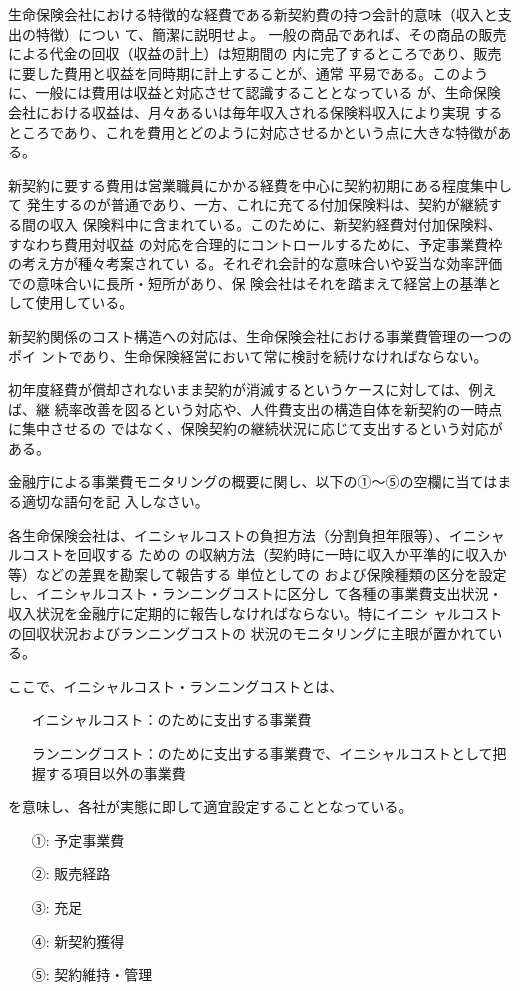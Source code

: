\documentclass[report,gutter=10mm,fore-edge=10mm,uplatex,dvipdfmx]{jlreq}
\begin{document}
生命保険会社における特徴的な経費である新契約費の持つ会計的意味（収入と支出の特徴）につい
て、簡潔に説明せよ。
\answer{}
一般の商品であれば、その商品の販売による代金の回収（収益の計上）は短期間の
内に完了するところであり、販売に要した費用と収益を同時期に計上することが、通常
平易である。このように、一般には費用は収益と対応させて認識することとなっている
が、生命保険会社における収益は、月々あるいは毎年収入される保険料収入により実現
するところであり、これを費用とどのように対応させるかという点に大きな特徴がある。

新契約に要する費用は営業職員にかかる経費を中心に契約初期にある程度集中して
発生するのが普通であり、一方、これに充てる付加保険料は、契約が継続する間の収入
保険料中に含まれている。このために、新契約経費対付加保険料、すなわち費用対収益
の対応を合理的にコントロールするために、予定事業費枠の考え方が種々考案されてい
る。それぞれ会計的な意味合いや妥当な効率評価での意味合いに長所・短所があり、保
険会社はそれを踏まえて経営上の基準として使用している。

新契約関係のコスト構造への対応は、生命保険会社における事業費管理の一つのポイ
ントであり、生命保険経営において常に検討を続けなければならない。

初年度経費が償却されないまま契約が消滅するというケースに対しては、例えば、継
続率改善を図るという対応や、人件費支出の構造自体を新契約の一時点に集中させるの
ではなく、保険契約の継続状況に応じて支出するという対応がある。

金融庁による事業費モニタリングの概要に関し、以下の①～⑤の空欄に当てはまる適切な語句を記
入しなさい。

各生命保険会社は、イニシャルコストの負担方法（分割負担年限等）、イニシャルコストを回収する
ための
の収納方法（契約時に一時に収入か平準的に収入か等）などの差異を勘案して報告する
単位としての
および保険種類の区分を設定し、イニシャルコスト・ランニングコストに区分し
て各種の事業費支出状況・
収入状況を金融庁に定期的に報告しなければならない。特にイニシ
ャルコストの回収状況およびランニングコストの
状況のモニタリングに主眼が置かれている。

ここで、イニシャルコスト・ランニングコストとは、
\begin{itemize}
\item[]  イニシャルコスト：のために支出する事業費
\item[]  ランニングコスト：のために支出する事業費で、イニシャルコストとして把握する項目以外の事業費
\end{itemize}
を意味し、各社が実態に即して適宜設定することとなっている。
\answer{}
\begin{itemize}
\item[①: ] 予定事業費
\item[②: ] 販売経路
\item[③: ] 充足
\item[④: ] 新契約獲得
\item[⑤: ] 契約維持・管理
\end{itemize}
\end{document}
